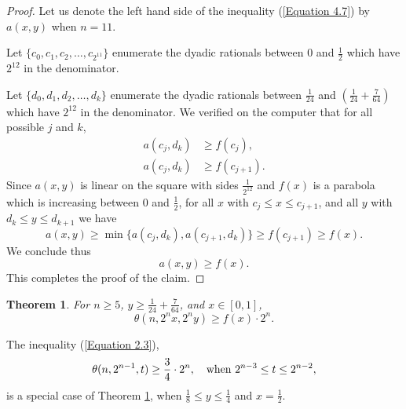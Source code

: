 \documentclass[12pt]{ucthesis}
\theoremstyle{plain}
\newtheorem{theorem}{Theorem}
\theoremstyle{definition}
\begin{document}
\begin{proof}
Let us denote the left hand side of the inequality (\ref{Equation 4.7}) by $a(x, y)$
when $n = 11$.

Let $\{c_0, c_1, c_2, \dots, c_{2^{11}}\}$ enumerate the dyadic rationals
between $0$ and $\frac{1}{2}$ which have $2^{12}$ in the denominator.

Let $\{d_0, d_1, d_2, \dots, d_k\}$ enumerate the dyadic rationals
between $\frac{1}{24}$ and $(\frac{1}{24} + \frac{7}{64})$ which have $2^{12}$
in the denominator.
We verified on the computer that for all possible $j$ and $k$,
\begin{align*}
a(c_j, d_k) & \ge f(c_j), \\
a(c_j, d_k) & \ge f(c_{j + 1}).
\end{align*}
Since $a(x, y)$ is linear on the square with sides $\frac{1}{2^{12}}$
and $f(x)$ is a parabola which is increasing between $0$ and $\frac{1}{2}$,
for all $x$ with $c_j \le x \le c_{j + 1}$, and all $y$ with $d_k \le y \le d_{k + 1}$
we have
\begin{equation*}
a(x, y) \ge \min\{a(c_j, d_k), a(c_{j + 1}, d_k)\} \ge f(c_{j + 1}) \ge f(x).
\end{equation*}
We conclude thus
\begin{equation*}
a(x, y) \ge f(x).
\end{equation*}
This completes the proof of the claim.
\end{proof}

\begin{theorem}
\label{Theorem 3}
For $n \ge 5$, $y \ge \frac{1}{24} + \frac{7}{64}$, and $x \in [0, 1]$,
\begin{equation*}
\theta(n, 2^n x, 2^n y) \ge f(x) \cdot 2^n.
\end{equation*}
\end{theorem}

The inequality (\ref{Equation 2.3}),
\begin{equation*}
\theta(n, 2^{n - 1}, t) \ge \frac{3}{4} \cdot 2^n, \quad
\textnormal{when } 2^{n - 3} \le t \le 2^{n - 2},
\end{equation*}
is a special case of Theorem \ref{Theorem 3},
when $\frac{1}{8} \le y \le \frac{1}{4}$ and $x = \frac{1}{2}$.
\end{document}
